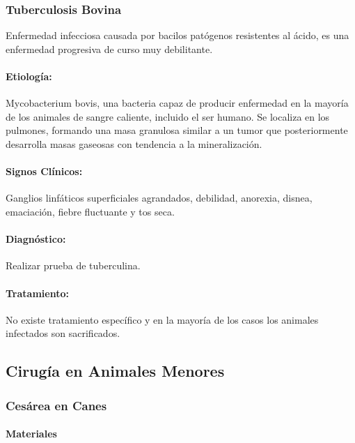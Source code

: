         \subsubsection{Tuberculosis Bovina}

            Enfermedad infecciosa causada por bacilos patógenos resistentes al ácido, es una enfermedad progresiva de curso muy debilitante.

            \paragraph{Etiología:} Mycobacterium bovis, una bacteria capaz de producir enfermedad en la mayoría de los animales de sangre caliente, incluido el ser humano. Se localiza en los pulmones, formando una masa granulosa similar a un tumor que posteriormente desarrolla masas gaseosas con tendencia a la mineralización.

            \paragraph{Signos Clínicos:} Ganglios linfáticos superficiales agrandados, debilidad, anorexia, disnea, emaciación, fiebre fluctuante y tos seca.

            \paragraph{Diagnóstico:} Realizar prueba de tuberculina.

            \paragraph{Tratamiento:} No existe tratamiento específico y en la mayoría de los casos los animales infectados son sacrificados. %

    \subsection{Cirugía en Animales Menores}

        \subsubsection{Cesárea en Canes}

            \paragraph{Materiales}

